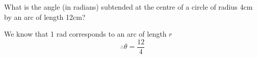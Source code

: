 \question What is the angle (in radians) subtended at the centre of a circle of 
radius 4cm by an arc of length 12cm?
\begin{solution}
	\par 
	We know that 1 rad corresponds to an arc of length $r$
	\[
		\therefore 
		\theta = \frac{12}{4}
	\]
\end{solution}

